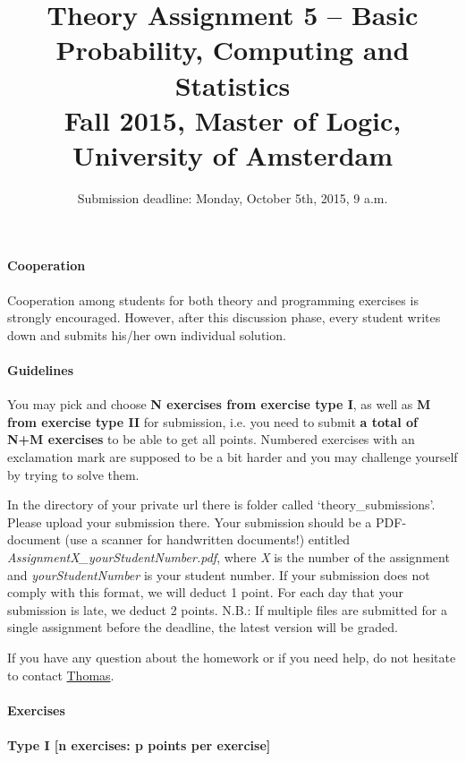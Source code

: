 \documentclass{article}
\title{Theory Assignment 5 -- Basic Probability, Computing and Statistics\\[2mm]
\large{Fall 2015, Master of Logic, University of Amsterdam}}
\author{}
\date{Submission deadline: Monday, October 5th, 2015, 9 a.m.}
\begin{document}
\maketitle

\paragraph{Cooperation}
Cooperation among students for both theory and programming exercises
is strongly encouraged.  However, after this discussion phase, every student writes down and submits his/her own individual solution.

\paragraph{Guidelines}
You may pick and choose {\bf N exercises from exercise type I}, as well as {\bf M from exercise type II} for submission, i.e. you need to submit {\bf a total of N+M exercises} to be able to get all points. Numbered exercises with an exclamation mark are supposed to be a bit harder and you may challenge yourself by trying to solve them.

In the directory of your private url there is folder called `theory\_submissions'. Please upload your submission there. Your submission should be a PDF-document (use a scanner for handwritten documents!) entitled \textit{AssignmentX\_yourStudentNumber.pdf}, where \textit{X} is the number of the assignment and \textit{yourStudentNumber} is your student number. If your submission does not comply with this format, we will deduct 1 point. For each day that your submission is late, we deduct 2 points. N.B.: If multiple files are submitted for a single assignment before the deadline, the latest version will be graded.

If you have any question about the homework or if you need help, do not hesitate to contact \href{mailto:T.S.Brochhagen@uva.nl}{Thomas}.

\paragraph{Exercises}

\paragraph{Type I [n exercises: p points per exercise]}
\end{document}
